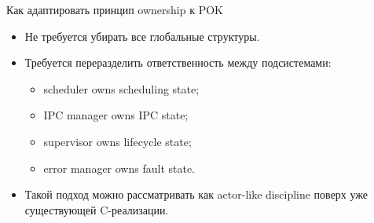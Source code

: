 \begin{frame}{Как адаптировать принцип ownership к POK}
	\begin{itemize}
		\item Не требуется убирать все глобальные структуры.
		\item Требуется переразделить ответственность между подсистемами:
		\begin{itemize}
			\item scheduler owns scheduling state;
			\item IPC manager owns IPC state;
			\item supervisor owns lifecycle state;
			\item error manager owns fault state.
		\end{itemize}
		\item Такой подход можно рассматривать как actor-like discipline поверх уже существующей C-реализации.
	\end{itemize}
\end{frame}